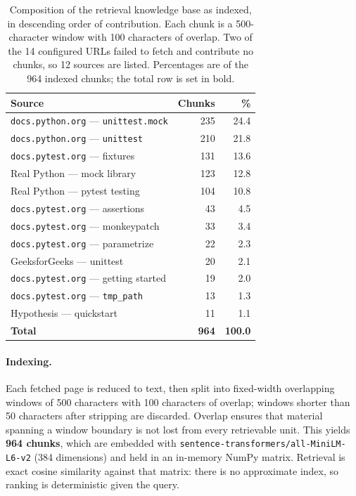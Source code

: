 \documentclass[smallextended]{svjour3}
\begin{document}
\begin{table}[htbp]
\centering
\caption{Composition of the retrieval knowledge base as indexed, in
descending order of contribution. Each chunk is a 500-character
window with 100 characters of overlap. Two of the 14 configured URLs
failed to fetch and contribute no chunks, so 12 sources are listed.
Percentages are of the 964 indexed chunks; the total row is set in bold.}\label{tab:kb}
\footnotesize
\begin{tabular}{@{}lrr@{}}
\toprule
Source & Chunks & \% \\
\midrule
\texttt{docs.python.org} --- \texttt{unittest.mock} & 235 & 24.4 \\
\texttt{docs.python.org} --- \texttt{unittest} & 210 & 21.8 \\
\texttt{docs.pytest.org} --- fixtures & 131 & 13.6 \\
Real Python --- mock library & 123 & 12.8 \\
Real Python --- pytest testing & 104 & 10.8 \\
\texttt{docs.pytest.org} --- assertions & 43 & 4.5 \\
\texttt{docs.pytest.org} --- monkeypatch & 33 & 3.4 \\
\texttt{docs.pytest.org} --- parametrize & 22 & 2.3 \\
GeeksforGeeks --- unittest & 20 & 2.1 \\
\texttt{docs.pytest.org} --- getting started & 19 & 2.0 \\
\texttt{docs.pytest.org} --- \texttt{tmp\_path} & 13 & 1.3 \\
Hypothesis --- quickstart & 11 & 1.1 \\
\midrule
\textbf{Total} & \textbf{964} & \textbf{100.0} \\
\bottomrule
\end{tabular}
\end{table}

\paragraph{Indexing.} Each fetched page is reduced to text, then split
into fixed-width overlapping windows of 500 characters with 100
characters of overlap; windows shorter than 50 characters after
stripping are discarded. Overlap ensures that material spanning a
window boundary is not lost from every retrievable unit. This yields
\textbf{964 chunks}, which are embedded with
\texttt{sentence-transformers/all-MiniLM-L6-v2} (384 dimensions) and
held in an in-memory NumPy matrix. Retrieval is exact cosine
similarity against that matrix: there is no approximate index, so
ranking is deterministic given the query.
\end{document}
